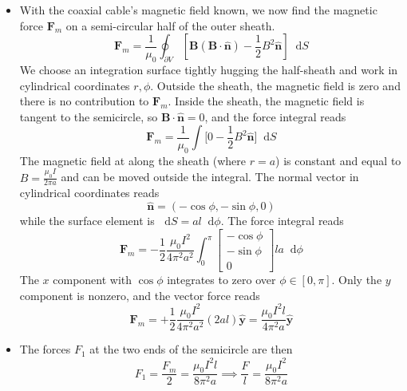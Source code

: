 \documentclass[11pt, a4paper]{article}
\newcommand{\diff}{\mathop{}\!\mathrm{d}} %
\renewcommand{\vec}[1]{\bm{#1}} %
\newcommand{\uvec}[1]{\hat{\vec{#1}}} %
\newcommand{\B}{\vec{B}}  %
\begin{document}
\begin{itemize}
	\item With the coaxial cable's magnetic field known, we now find the magnetic force $ \vec{F}_{m} $ on a semi-circular half of the outer sheath.
	\begin{equation*}
		\vec{F}_{m} = \frac{1}{\mu_{0}}\oint_{\partial V}\left [\B(\B \cdot \uvec{n}) - \frac{1}{2}B^{2}\uvec{n}\right ] \diff S
	\end{equation*}
	We choose an integration surface tightly hugging the half-sheath and work in cylindrical coordinates $ r, \phi $. Outside the sheath, the magnetic field is zero and there is no contribution to $ \bm{F}_{m} $. Inside the sheath, the magnetic field is tangent to the semicircle, so $ \vec{B}\cdot \uvec{n} = 0 $, and the force integral reads
	\begin{equation*}
		\vec{F}_{m} = \frac{1}{\mu_{0}} \int \big[0 - \frac{1}{2}B^{2}\uvec{n}\big] \diff S 
	\end{equation*}
	The magnetic field at along the sheath (where $ r = a $) is constant and equal to $ B = \frac{\mu_{0}I}{2\pi a} $ and can be moved outside the integral. The normal vector in cylindrical coordinates reads 
	\begin{equation*}
		\uvec{n} = (- \cos \phi, -\sin \phi, 0)
	\end{equation*} 
	while the surface element is $ \diff S = a l \diff \phi $. The force integral reads
	\begin{equation*}
		\vec{F}_{m} = - \frac{1}{2}\frac{\mu_{0}I^{2}}{4\pi^{2}a^{2}} \int_{0}^{\pi}
		\begin{bmatrix}
			- \cos \phi\\
			 -\sin \phi\\
			  0
		\end{bmatrix}
		l a \diff \phi
	\end{equation*}
	The $ x $ component with $ \cos \phi $ integrates to zero over $ \phi \in [0, \pi] $. Only the $ y $ component is nonzero, and the vector force reads
	\begin{equation*}
	 	\vec{F}_{m} = +\frac{1}{2}\frac{\mu_{0}I^{2}}{4\pi^{2}a^{2}} (2a l)\uvec{y} = \frac{\mu_{0}I^{2}l}{4\pi^{2}a} \uvec{y}
	\end{equation*}
	
	\item The forces $ F_{1} $ at the two ends of the semicircle are then
	\begin{equation*}
		F_{1} = \frac{F_{m}}{2} =  \frac{\mu_{0}I^{2}l}{8\pi^{2}a} \implies \frac{F}{l} = \frac{\mu_{0}I^{2}}{8\pi^{2}a} 
	\end{equation*}
\end{itemize}
\end{document}
